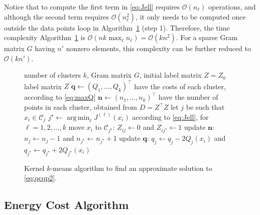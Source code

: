 \documentclass[aps,preprint,nofootinbib,floatfix]{revtex4-1}
\DeclareMathOperator*{\argmin}{arg\,min}
\newcommand\C{{\mathcal{C}}}
\newcommand\OO{{\mathcal{O}}}
\begin{document}
Notice that to compute the first term in \eqref{eq:Jell} requires
$\OO(n_\ell)$ operations, and although the second term requires
$\OO(n_\ell^2)$, it only needs to be computed once outside the data
points loop in Algorithm~\ref{kmeans_algo} (step 1).
Therefore, the time complexity Algorithm~\ref{kmeans_algo} is
$\OO(n k \max_\ell n_\ell) = \OO(k n^2)$. For a sparse
Gram matrix $G$ having
$n'$ nonzero elements, this complexity can be further reduced
to $\OO(k n')$. 

\begin{figure}
\begin{algorithm}[H]
\vspace{.5em}
\begin{algorithmic}[1]
    \INPUT number of clusters $k$, Gram matrix $G$, initial label
    matrix $Z = Z_0$
    \OUTPUT label matrix $Z$ 
  \STATE $\bm{q} \leftarrow (Q_1, \dotsc, Q_k)^\top$ 
            have the costs of each cluster, according to \eqref{eq:maxQ}
  \STATE $\bm{n} \leftarrow (n_1,\dotsc,n_k)^\top$ 
        have the number of points in each cluster, obtained 
        from $D = Z^\top Z$
  \REPEAT
        \STATE let $j$ be such that $x_i \in \C_j$
        \STATE $j^\star \leftarrow \argmin_{\ell} J^{(\ell)}(x_i)$
            according to \eqref{eq:Jell}, for $\ell=1,2,\dots,k$
            \STATE move $x_i$ to $\C_{j^\star}$: $Z_{ij} \leftarrow 0$ and
            $Z_{ij^\star} \leftarrow 1$
            \STATE update $\bm{n}$: $n_j \leftarrow n_j - 1$ and
                    $n_{j^\star} \leftarrow n_{j^\star} + 1$
            \STATE update $\bm{q}$: $q_j \leftarrow q_j - 2Q_j(x_i)$ and
    $q_{j^\star} \leftarrow q_{j^\star} + 2Q_{j^\star}(x_i)$
        \ENDIF
    \ENDFOR
\end{algorithmic}
\caption{\label{kmeans_algo}
Kernel $k$-means algorithm 
to find an approximate solution to \eqref{eq:qcqp2}.
\hspace{\fill}
}
\end{algorithm}
\end{figure}


\subsection{Energy Cost Algorithm}
\end{document}
